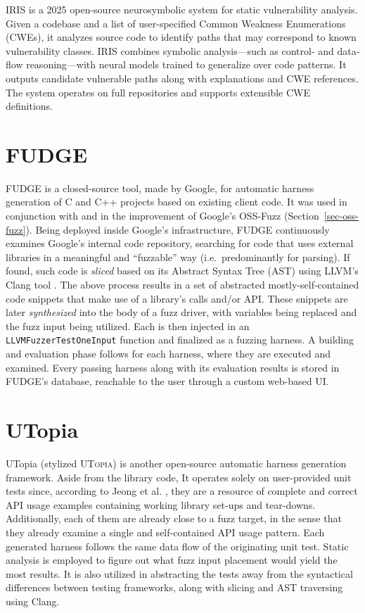 \documentclass[
  a4paper,
]{scrreprt}
\theoremstyle{definition}
\theoremstyle{remark}
\begin{document}
IRIS \autocite{iris} is a 2025 open-source neurosymbolic system for
static vulnerability analysis. Given a codebase and a list of
user-specified Common Weakness Enumerations (CWEs), it analyzes source
code to identify paths that may correspond to known vulnerability
classes. IRIS combines symbolic analysis---such as control- and
data-flow reasoning---with neural models trained to generalize over code
patterns. It outputs candidate vulnerable paths along with explanations
and CWE references. The system operates on full repositories and
supports extensible CWE definitions.

\section{FUDGE}\label{fudge}

FUDGE \autocite{fudge} is a closed-source tool, made by Google, for
automatic harness generation of C and C++ projects based on existing
client code. It was used in conjunction with and in the improvement of
Google's OSS-Fuzz \autocite{oss-fuzz} (Section~\ref{sec-oss-fuzz}).
Being deployed inside Google's infrastructure, FUDGE continuously
examines Google's internal code repository, searching for code that uses
external libraries in a meaningful and ``fuzzable'' way
(i.e.~predominantly for parsing). If found, such code is \emph{sliced}
\autocite{sasirekha2011Slicing} based on its Abstract Syntax Tree (AST)
using LLVM's Clang tool \autocite{llvm}. The above process results in a
set of abstracted mostly-self-contained code snippets that make use of a
library's calls and/or API. These snippets are later \emph{synthesized}
into the body of a fuzz driver, with variables being replaced and the
fuzz input being utilized. Each is then injected in an
\texttt{LLVMFuzzerTestOneInput} function and finalized as a fuzzing
harness. A building and evaluation phase follows for each harness, where
they are executed and examined. Every passing harness along with its
evaluation results is stored in FUDGE's database, reachable to the user
through a custom web-based UI.

\section{UTopia}\label{utopia}

UTopia \autocite{utopia} (stylized \textsc{UTopia}) is another
open-source automatic harness generation framework. Aside from the
library code, It operates solely on user-provided unit tests since,
according to Jeong et al. \autocite{utopia}, they are a resource of
complete and correct API usage examples containing working library
set-ups and tear-downs. Additionally, each of them are already close to
a fuzz target, in the sense that they already examine a single and
self-contained API usage pattern. Each generated harness follows the
same data flow of the originating unit test. Static analysis is employed
to figure out what fuzz input placement would yield the most results. It
is also utilized in abstracting the tests away from the syntactical
differences between testing frameworks, along with slicing and AST
traversing using Clang.
\end{document}

